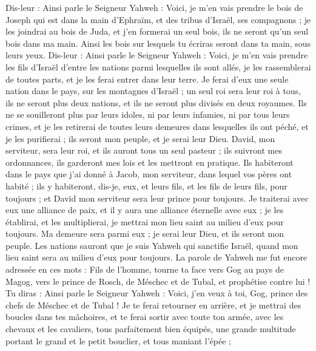 \begin{multicols}{2}
Dis-leur : Ainsi parle le Seigneur Yahweh : Voici, je m'en vais prendre le bois de Joseph qui est dans la main d'Ephraïm, et des tribus d'Israël, ses compagnons ; je les joindrai au bois de Juda, et j'en formerai un seul bois, ils ne seront qu'un seul bois dans ma main.
Ainsi les bois sur lesquels tu écriras seront dans ta main, sous leurs yeux.
Dis-leur : Ainsi parle le Seigneur Yahweh : Voici, je m'en vais prendre les fils d'Israël d'entre les nations parmi lesquelles ils sont allés, je les rassemblerai de toutes parts, et je les ferai entrer dans leur terre.
Je ferai d'eux une seule nation dans le pays, sur les montagnes d'Israël ; un seul roi sera leur roi à tous, ils ne seront plus deux nations, et ils ne seront plus divisés en deux royaumes.
Ils ne se souilleront plus par leurs idoles, ni par leurs infamies, ni par tous leurs crimes, et je les retirerai de toutes leurs demeures dans lesquelles ils ont péché, et je les purifierai ; ils seront mon peuple, et je serai leur Dieu.
David, mon serviteur, sera leur roi, et ils auront tous un seul pasteur ; ils suivront mes ordonnances, ils garderont mes lois et les mettront en pratique.
Ils habiteront dans le pays que j'ai donné à Jacob, mon serviteur, dans lequel vos pères ont habité ; ils y habiteront, dis-je, eux, et leurs fils, et les fils de leurs fils, pour toujours ; et David mon serviteur sera leur prince pour toujours.
Je traiterai avec eux une alliance de paix, et il y aura une alliance éternelle avec eux ; je les établirai, et les multiplierai, je mettrai mon lieu saint au milieu d'eux pour toujours.
Ma demeure sera parmi eux ; je serai leur Dieu, et ils seront mon peuple.
Les nations sauront que je suis Yahweh qui sanctifie Israël, quand mon lieu saint sera au milieu d'eux pour toujours.
\VerseOne{}La parole de Yahweh me fut encore adressée en ces mots :
Fils de l'homme, tourne ta face vers Gog au pays de Magog, vers le prince de Rosch, de Méschec et de Tubal, et prophétise contre lui !
Tu diras : Ainsi parle le Seigneur Yahweh : Voici, j'en veux à toi, Gog, prince des chefs de Méschec et de Tubal !
Je te ferai retourner en arrière, et je mettrai des boucles dans tes mâchoires, et te ferai sortir avec toute ton armée, avec les chevaux et les cavaliers, tous parfaitement bien équipés, une grande multitude portant le grand et le petit bouclier, et tous maniant l'épée ;

\end{multicols}
